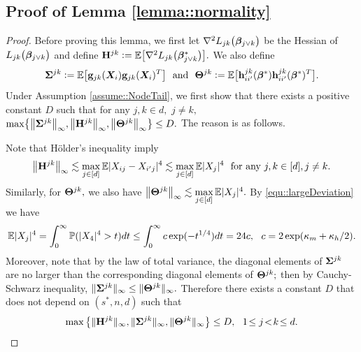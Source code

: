 \documentclass[twoside,11pt]{article}
\newcommand{\defeq}{\vcentcolon=}
\newcommand*{\bbetas}{\bbeta^*}
\newcommand*{\hessstarst}{\nabla^2  L_{jk}\bigl(\bbeta_{j \vee k}^*\bigr)}
\newcommand*{\hessst}{\nabla^2  L_{jk}\bigl(\bbeta_{j \vee k}\bigr)}
\begin{document}
\subsection{Proof of Lemma \ref{lemma::normality}}\label{proof::lemma::normality}
\begin{proof} 
Before proving this lemma, we first let $\hessst$ be the Hessian of $L_{jk}\bigl(\bm{\beta}_{j\vee k}\bigr)$ and define $\Hb^{jk}\defeq\EE\bigl[ \hessstarst\bigr].$ We also define $$\bSigma^{jk} \defeq \EE \bigl[  \gb_{jk}(\bX_{i})\gb_{jk}(\bX_i)^T \bigr]  ~~\text{and}~~\bTheta^{jk} \defeq \EE \bigl [\hb_{ii'}^{jk}(\bbetas) \hb_{ii'}^{jk}(\bbetas)^T \bigr]. $$  
Under Assumption \ref{assume::NodeTail}, we first show that there exists a positive constant $D$ such that for any $j,k\in d,$ $j\neq k,$  $\max \bigl\{\bigl\| \bm{\Sigma}^{jk} \bigr\|_{\infty } , \big\| \mathbf{H}^{jk}\big\| _{\infty},\bigl \|\bm{\Theta}^{jk}\bigl \| _\infty  \bigr\}\leq D.$ The reason is as follows.
 
Note that H\"older's inequality imply
$$
\bigl \| \mathbf{H}^{jk} \bigr\|_\infty \lesssim  \max \limits_{j \in[d]} \mathbb{E} |X_{ij} - X_{i'j}|^4\lesssim \max \limits_{j \in [d]}  \mathbb{E} |X_j|^4 ~~\text{for any}~j,k\in [d],j\neq k.
$$
Similarly, for $\bm{\Theta}^{jk},$ we also have $ \bigl\|  \bm{\Theta}^{jk} \bigr\|_\infty \lesssim\max \limits_{j \in [d]}  \mathbb{E} |X_j|^4.$
By \eqref{equ::largeDeviation} we have
$$\mathbb{E}|X_j|^4 = \int_0^\infty \mathbb{P}( |X_4|^4 > t) dt \leq  \int_0^\infty c \exp( -t^{1/4}) dt = 24 c, ~~c = 2\exp(\kappa_m+\kappa_h/2).$$ 
Moreover, note that by the law of total variance, the diagonal elements of $\bm{\Sigma}^{jk}$ are no larger than the corresponding diagonal elements of $\bm{\Theta}^{jk};$ then by Cauchy-Schwarz inequality, $ \| \bm{\Sigma}^{jk}  \|_\infty \leq   \| \bm{\Theta}^{jk}  \|_\infty.$
Therefore there exists a constant $D$ that does not depend on $(s^*,n,d)$ such that  
\begin{align}\label{equ::MaxNormThreeMat}
 \max \big\{   \| \mathbf{H}^ {jk}\|_\infty,  \| \bm{\Sigma}^{jk}   \|_\infty ,   \|  \bm{\Theta}^{jk}   \|_\infty \bigr \} \leq D,~~ 1\!\leq j\!<\!k\!\leq d.
\end{align}


\end{proof}
\end{document}
